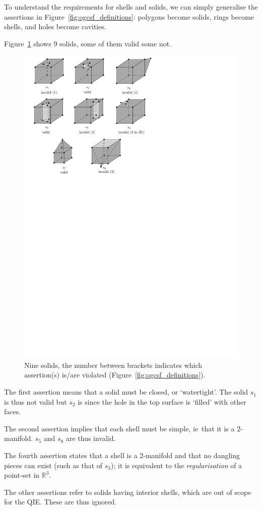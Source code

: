 \documentclass[a4paper,parskip=half,11pt]{scrartcl}
\newcommand{\ie}{ie}
\begin{document}
To understand the requirements for shells and solids, we can simply generalise the assertions in Figure~\ref{fig:ogcsf_definitions}: polygons become solids, rings become shells, and holes become cavities.

Figure~\ref{fig:valid3d} shows 9 solids, some of them valid some not.
\begin{figure}
  \centering
  \includegraphics[width=0.85\linewidth]{figs/valid3d.pdf}
  \caption{Nine solids, the number between brackets indicates which assertion(s) is/are violated (Figure~\ref{fig:ogcsf_definitions}).}
\label{fig:valid3d}
\end{figure}

The first assertion means that a solid must be closed, or `watertight'.
The solid $s_1$ is thus not valid but $s_2$ is since the hole in the top surface is `filled' with other faces.

The second assertion implies that each shell must be simple, \ie\ that it is a 2-manifold.
$s_5$ and $s_8$ are thus invalid.

The fourth assertion states that a shell is a 2-manifold and that no dangling pieces can exist (such as that of $s_3$); it is equivalent to the \emph{regularisation} of a point-set in $\mathbb{R}^3$.

The other assertions refer to solids having interior shells, which are out of scope for the QIE\@.
These are thus ignored.






\end{document}
